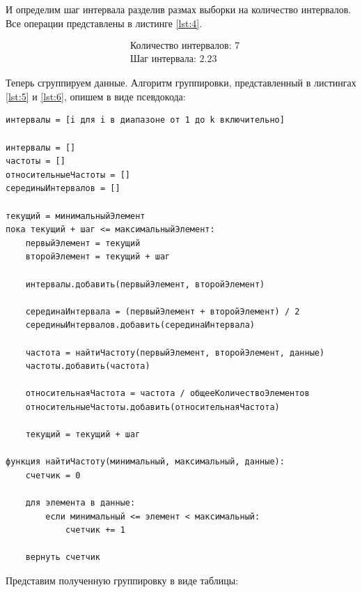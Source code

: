 \documentclass[a4paper, 14pt]{extarticle}
\begin{document}
И определим шаг интервала разделив размах выборки на количество интервалов.
Все операции представлены в листинге \ref{lst:4}.

\begin{align*}
    & \text{Количество интервалов: } 7 \\
    & \text{Шаг интервала: }  2.23
\end{align*}

Теперь сгруппируем данные. Алгоритм группировки, представленный в листингах 
\ref{lst:5} и \ref{lst:6}, опишем в виде псевдокода:

\begin{tcolorbox}[colback=gray!10, colframe=gray!50, title=Псевдокод алгоритма группировки данных]
    \begin{verbatim}
интервалы = [i для i в диапазоне от 1 до k включительно]

интервалы = []
частоты = []
относительныеЧастоты = []
серединыИнтервалов = []

текущий = минимальныйЭлемент
пока текущий + шаг <= максимальныйЭлемент:
    первыйЭлемент = текущий
    второйЭлемент = текущий + шаг

    интервалы.добавить(первыйЭлемент, второйЭлемент)

    серединаИнтервала = (первыйЭлемент + второйЭлемент) / 2
    серединыИнтервалов.добавить(серединаИнтервала)

    частота = найтиЧастоту(первыйЭлемент, второйЭлемент, данные)
    частоты.добавить(частота)

    относительнаяЧастота = частота / общееКоличествоЭлементов
    относительныеЧастоты.добавить(относительнаяЧастота)

    текущий = текущий + шаг

функция найтиЧастоту(минимальный, максимальный, данные):
    счетчик = 0

    для элемента в данные:
        если минимальный <= элемент < максимальный:
            счетчик += 1

    вернуть счетчик        
    \end{verbatim}
\end{tcolorbox}

\newpage

Представим полученную группировку в виде таблицы:
\end{document}
